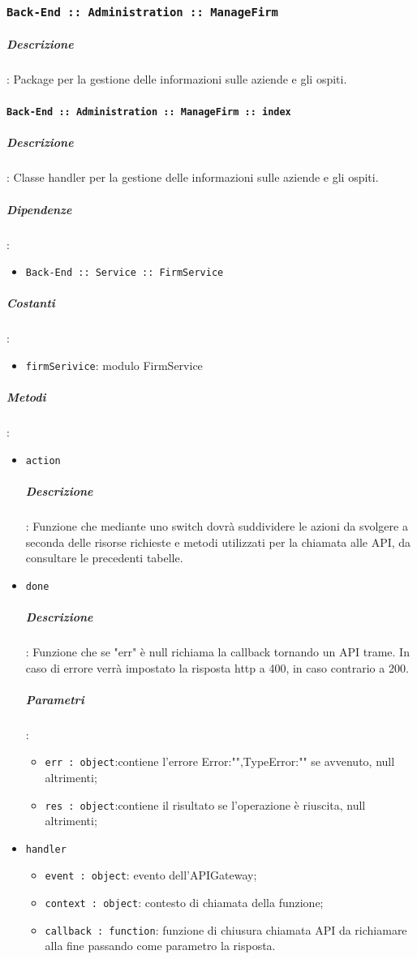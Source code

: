 \documentclass[../DefinizioneDiProdotto_v2.0.0.tex]{subfiles}
\begin{document}
\subsubsection{\texttt{Back-End :: Administration :: ManageFirm}}
\subparagraph{Descrizione}: Package per la gestione delle informazioni sulle aziende e gli ospiti.

\paragraph{\texttt{Back-End :: Administration :: ManageFirm :: index}}
\subparagraph{Descrizione}: Classe handler per la gestione delle informazioni sulle aziende e gli ospiti.
\subparagraph{Dipendenze}:
\begin{itemize}
	\item \texttt{Back-End :: Service :: FirmService}
\end{itemize}
\subparagraph{Costanti}:
\begin{itemize}
	\item \texttt{firmSerivice}: modulo FirmService
\end{itemize}
\subparagraph{Metodi}:
\begin{itemize}
	\item \texttt{action}
	      \subparagraph{Descrizione}: Funzione che mediante uno switch dovrà suddividere le azioni da svolgere a seconda delle risorse richieste e metodi utilizzati per la chiamata alle API, da consultare le precedenti tabelle.
	\item \texttt{done}
	      \subparagraph{Descrizione}: Funzione che se "err" è null richiama la callback tornando un API trame. In caso di errore verrà impostato la risposta http a 400, in caso contrario a 200.
	      \subparagraph{Parametri}:
	      \begin{itemize}
	      	\item \texttt{err : object}:contiene l'errore {Error:"",TypeError:""} se avvenuto, null altrimenti;
	      	\item \texttt{res : object}:contiene il risultato se l'operazione è riuscita, null altrimenti;
	      \end{itemize}
	\item \texttt{handler}
	      \begin{itemize}
	      	\item \texttt{event : object}: evento dell'APIGateway;
	      	\item \texttt{context : object}: contesto di chiamata della funzione;
	      	\item \texttt{callback : function}: funzione di chiusura chiamata API da richiamare alla fine passando come parametro la risposta.
	      \end{itemize}
\end{itemize}
\end{document}
